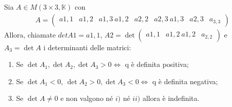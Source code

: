 \documentclass[a4paper, oneside]{article}
\begin{document}
        \begin{theorem}
            Sia $A \in M(3 \times 3, \mathbb{K})$ con
            \begin{gather*}
                A= \begin{pmatrix}
                    a{1, 1} & a{1, 2} & a{1, 3} \
                    a{1, 2} & a{2, 2} & a{2, 3} \
                    a{1, 3} & a{2, 3} & a_{3, 3}
                \end{pmatrix}
            \end{gather*}
            Allora, chiamate $det A1 = a{1, 1}$, $A2 = \det \begin{pmatrix}
                a{1, 1} & a{1, 2} \
                a{1, 2} & a_{2, 2}
            \end{pmatrix}$ e $A_3 = \det A$ i determinanti delle matrici:
            \begin{enumerate}[$i)$]
                \item Se $\det A_1, \det A_2, \det A_3 > 0 \Longleftrightarrow $ q è definita positiva;
                \item Se $\det A_1 < 0$, $\det A_2 > 0, \det A_3 < 0 \Longleftrightarrow $ q è definita negativa;
                \item Se $\det A \neq 0$ e non valgono né $i)$ né $ii)$ allora è indefinita.
            \end{enumerate}
        \end{theorem}
        
\end{document}
